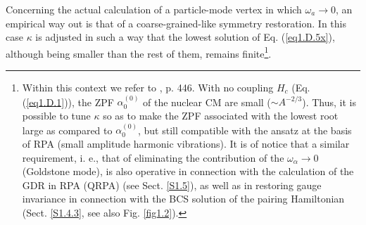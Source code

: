 \begin{subappendices}
Concerning the actual calculation of a particle-mode vertex in which $\omega_a\rightarrow 0$, an empirical
way out is that of a coarse-grained-like symmetry restoration.
In this case $\kappa$ is adjusted in such a way that the lowest solution of Eq. (\ref{eq1.D.5x}), although
being smaller than the  rest of them, remains finite\footnote{\label{f145C2} Within this context we refer to \cite{Bohr:75}, p. 446. With no coupling $H_c$ (Eq. (\ref{eq1.D.1})), the  ZPF $\alpha^{(0)}_0$ of the nuclear CM are small ($\sim A^{-2/3}$). Thus, it is possible to tune $\kappa$ so as to make the ZPF associated with the lowest root large as compared to $\alpha^{(0)}_0$, but still compatible with the ansatz at the basis of RPA (small amplitude harmonic vibrations). It is of notice that a similar requirement, i. e., that of eliminating the contribution of the $\omega_\alpha\to 0$  (Goldstone mode), is also operative in connection with the calculation of the GDR in RPA (QRPA) (see Sect. \ref{S1.5}), as well as in restoring gauge invariance in connection with the BCS solution of the pairing Hamiltonian (Sect. \ref{S1.4.3}, see also Fig. \ref{fig1.2}).}.


\end{subappendices}
